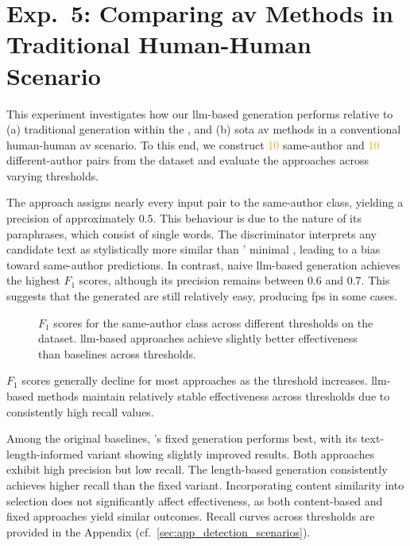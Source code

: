 \section{Exp.\ 5: Comparing \acs{av} Methods in Traditional Human-Human Scenario}
\label{sec:results_trad_av}


This experiment investigates how our \ac{llm}-based \imp{} generation performs relative to (a) traditional \imp{} generation within the \impAppr{}, and (b) \acl{sota} \ac{av} methods in a conventional human-human \ac{av} scenario. 
To this end, we construct \textcolor{orange}{10} same-author and \textcolor{orange}{10} different-author pairs from the \dataStudent{} dataset and evaluate the approaches across varying thresholds.

The \mirrorMinds{} approach assigns nearly every input pair to the same-author class, yielding a precision of approximately $0.5$. 
This behaviour is due to the nature of its paraphrases, which consist of single words. 
The discriminator interprets any candidate text as stylistically more similar than \mirrorMinds{}' minimal \imps{}, leading to a bias toward same-author predictions. 
In contrast, naive \ac{llm}-based \imp{} generation achieves the highest $F_1$ scores, although its precision remains between $0.6$ and $0.7$. 
This suggests that the generated \imps{} are still relatively easy, producing \acp{fp} in some cases.

\begin{figure}[h]
\centering
    
  \caption[Traditional \ac{av} $F_1$ scores.]{$F_1$ scores for the same-author class across different thresholds on the \dataStudent{} dataset. 
\ac{llm}-based approaches achieve slightly better effectiveness than baselines across thresholds.}
  \label{fig:human-human_f1}
\end{figure}

$F_1$ scores generally decline for most approaches as the threshold increases. 
\ac{llm}-based methods maintain relatively stable effectiveness across thresholds due to consistently high recall values. 

Among the original baselines, \citet{koppel_determining_2014}'s fixed \imp{} generation performs best, with its text-length-informed variant showing slightly improved results. 
Both approaches exhibit high precision but low recall. 
The length-based \imp{} generation consistently achieves higher recall than the fixed variant. 
Incorporating content similarity into \imp{} selection does not significantly affect effectiveness, as both content-based and fixed \imp{} approaches yield similar outcomes. 
Recall curves across thresholds are provided in the Appendix (cf.~\autoref{sec:app_detection_scenarios}).
